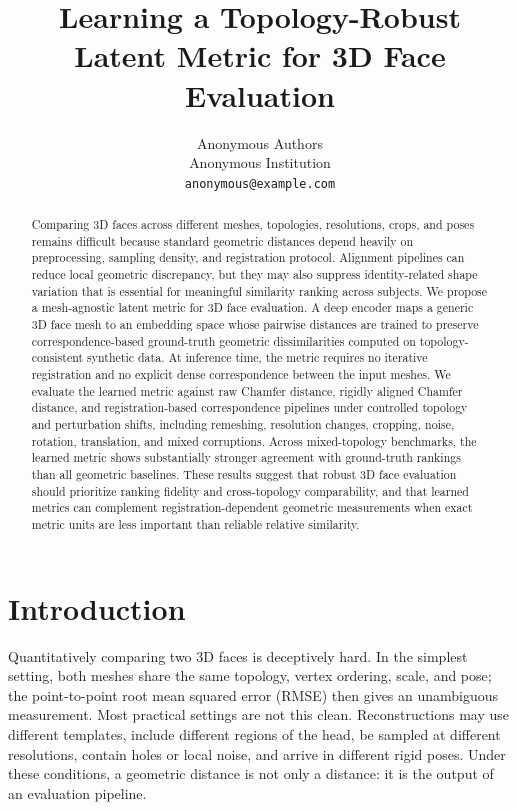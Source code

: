 \documentclass{article}
\title{Learning a Topology-Robust Latent Metric for 3D Face Evaluation}
\author{%
  Anonymous Authors\\
  Anonymous Institution\\
  \texttt{anonymous@example.com}
}
\begin{document}
\maketitle

\begin{abstract}
Comparing 3D faces across different meshes, topologies, resolutions, crops, and poses remains difficult because standard geometric distances depend heavily on preprocessing, sampling density, and registration protocol. Alignment pipelines can reduce local geometric discrepancy, but they may also suppress identity-related shape variation that is essential for meaningful similarity ranking across subjects. We propose a mesh-agnostic latent metric for 3D face evaluation. A deep encoder maps a generic 3D face mesh to an embedding space whose pairwise distances are trained to preserve correspondence-based ground-truth geometric dissimilarities computed on topology-consistent synthetic data. At inference time, the metric requires no iterative registration and no explicit dense correspondence between the input meshes. We evaluate the learned metric against raw Chamfer distance, rigidly aligned Chamfer distance, and registration-based correspondence pipelines under controlled topology and perturbation shifts, including remeshing, resolution changes, cropping, noise, rotation, translation, and mixed corruptions. Across mixed-topology benchmarks, the learned metric shows substantially stronger agreement with ground-truth rankings than all geometric baselines. These results suggest that robust 3D face evaluation should prioritize ranking fidelity and cross-topology comparability, and that learned metrics can complement registration-dependent geometric measurements when exact metric units are less important than reliable relative similarity.
\end{abstract}

\section{Introduction}

Quantitatively comparing two 3D faces is deceptively hard. In the simplest setting, both meshes share the same topology, vertex ordering, scale, and pose; the point-to-point root mean squared error (RMSE) then gives an unambiguous measurement. Most practical settings are not this clean. Reconstructions may use different templates, include different regions of the head, be sampled at different resolutions, contain holes or local noise, and arrive in different rigid poses. Under these conditions, a geometric distance is not only a distance: it is the output of an evaluation pipeline.
\end{document}
